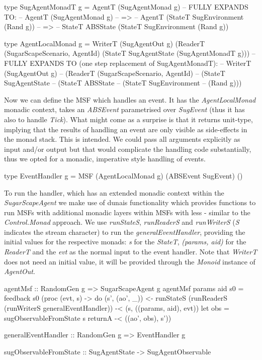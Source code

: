 \begin{HaskellCode}
type SugAgentMonadT g = AgentT (SugAgentMonad g)
-- FULLY EXPANDS TO:
-- AgentT (SugAgentMonad g)
--  =>
-- AgentT (StateT SugEnvironment (Rand g))
--  =>
-- StateT ABSState (StateT SugEnvironment (Rand g))

type AgentLocalMonad g = WriterT (SugAgentOut g) 
                           (ReaderT (SugarScapeScenario, AgentId) 
                             (StateT SugAgentState (SugAgentMonadT g)))
-- FULLY EXPANDS TO (one step replacement of SugAgentMonadT):
-- WriterT (SugAgentOut g) 
--  (ReaderT (SugarScapeScenario, AgentId) 
 --   (StateT SugAgentState 
--      (StateT ABSState 
--        (StateT SugEnvironment 
--          (Rand g)))  
\end{HaskellCode}

Now we can define the MSF which handles an event. It has the \textit{AgentLocalMonad} monadic context, takes an \textit{ABSEvent} parametrised over \textit{SugEvent} (thus it has also to handle \textit{Tick}). What might come as a surprise is that it returns unit-type, implying that the results of handling an event are only visible as side-effects in the monad stack. This is intended. We could pass all arguments explicitly as input and/or output but that would complicate the handling code substantially, thus we opted for a monadic, imperative style handling of events.

\begin{HaskellCode}
type EventHandler g = MSF (AgentLocalMonad g) (ABSEvent SugEvent) ()
\end{HaskellCode}

To run the handler, which has an extended monadic context within the \textit{SugarScapeAgent} we make use of dunais functionality which provides functions to run MSFs with additional monadic layers within MSFs with less - similar to the \textit{Control.Monad} approach. We use \textit{runStateS}, \textit{runReaderS} and \textit{runWriterS} (\textit{S} indicates the stream character) to run the \textit{generalEventHandler}, providing the initial values for the respective monads: \textit{s} for the \textit{StateT}, \textit{(params, aid)} for the \textit{ReaderT} and the \textit{evt} as the normal input to the event handler. Note that \textit{WriterT} does not need an initial value, it will be provided through the \textit{Monoid} instance of \textit{AgentOut}.

\begin{HaskellCode}
agentMsf :: RandomGen g => SugarScapeAgent g
agentMsf params aid s0 = feedback s0 (proc (evt, s) -> do
  (s', (ao', _)) <- runStateS (runReaderS (runWriterS generalEventHandler)) -< (s, ((params, aid), evt))
  let obs = sugObservableFromState s
  returnA -< ((ao', obs), s'))

generalEventHandler :: RandomGen g => EventHandler g

sugObservableFromState :: SugAgentState -> SugAgentObservable
\end{HaskellCode}

